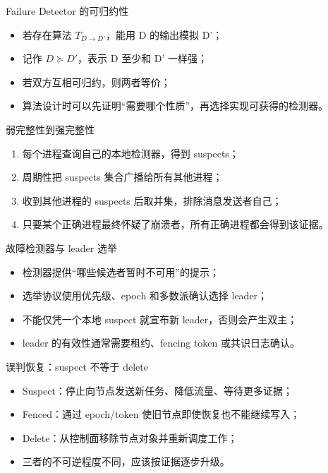 \documentclass[UTF8,fontset=none,aspectratio=169,10pt]{beamer}
\begin{document}

\begin{frame}{Failure Detector 的可归约性}
\begin{itemize}
  \item 若存在算法 $T_{D\rightarrow D'}$，能用 D 的输出模拟 D'；
  \item 记作 $D\succeq D'$，表示 D 至少和 D' 一样强；
  \item 若双方互相可归约，则两者等价；
  \item 算法设计时可以先证明“需要哪个性质”，再选择实现可获得的检测器。
\end{itemize}
\end{frame}

\begin{frame}{弱完整性到强完整性}
\begin{enumerate}
  \item 每个进程查询自己的本地检测器，得到 suspects；
  \item 周期性把 suspects 集合广播给所有其他进程；
  \item 收到其他进程的 suspects 后取并集，排除消息发送者自己；
  \item 只要某个正确进程最终怀疑了崩溃者，所有正确进程都会得到该证据。
\end{enumerate}
\vfill
{}
\end{frame}

\begin{frame}{故障检测器与 leader 选举}
\begin{itemize}
  \item 检测器提供“哪些候选者暂时不可用”的提示；
  \item 选举协议使用优先级、epoch 和多数派确认选择 leader；
  \item 不能仅凭一个本地 suspect 就宣布新 leader，否则会产生双主；
  \item leader 的有效性通常需要租约、fencing token 或共识日志确认。
\end{itemize}
\end{frame}

\begin{frame}{误判恢复：suspect 不等于 delete}
\begin{itemize}
  \item Suspect：停止向节点发送新任务、降低流量、等待更多证据；
  \item Fenced：通过 epoch/token 使旧节点即使恢复也不能继续写入；
  \item Delete：从控制面移除节点对象并重新调度工作；
  \item 三者的不可逆程度不同，应该按证据逐步升级。
\end{itemize}
\end{frame}
\end{document}
